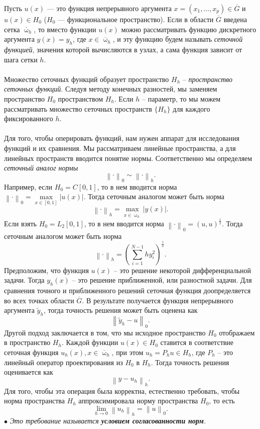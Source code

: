 \documentclass[a4paper, 12pt]{report}
\numberwithin{equation}{section}
\newcommand{\ol}{\overline}
\renewcommand{\omega}{\upomega}
\newcommand\Norm[1]{\left\| #1 \right\|}
\begin{document}
Пусть $u(x)$ --- это функция непрерывного аргумента $x = (x_1, \ldots, x_p)\in \overline G$ и $u(x) \in H_0$ ($H_0$ --- функциональное пространство). Если в области $\overline G$ введена сетка $\overline \omega_h$, то вместо функции $u(x)$ можно рассматривать функцию дискретного аргумента $y(x) = y_h$, где $x\in \ol \omega _h$, и эту функцию будем называть \textit{сеточной функцией}, значения которой вычисляются в узлах, а сама функция зависит от шага сетки $h$.\\\\
Множество сеточных функций образует пространство $H_h$ -- \textit{пространство сеточных функций}. Следуя методу конечных разностей, мы заменяем пространство $H_0$ пространством $H_h$. Если $h$ -- параметр, то мы можем рассматривать множество сеточных пространств $\{H_h\}$ для каждого фиксированного $h$.\\\\
Для того, чтобы оперировать функций, нам нужен аппарат для исследования функций и их сравнения. Мы рассматриваем линейные пространства, а для линейных пространств вводится понятие нормы. Соответственно мы определяем \textit{сеточный аналог нормы} $$\Norm {\cdot}_0 \sim \Norm {\cdot} _h.$$
Например, если $H_ 0 = C[0,1]$, то в нем вводится норма $\Norm {\cdot}_0 = \underset{x\in [0,1]} {\max}|u(x)|$. Тогда сеточным аналогом может быть норма $$\Norm {\cdot}_h = \underset{x \in \ol \omega_h}{\max}|y(x)|.$$
Если взять $H_ 0 = L_2[0,1]$, то в нем вводится норма $\Norm {\cdot}_0 = (u,u)^\frac12$. Тогда сеточным аналогом может быть норма $$\Norm {\cdot}_h = \left(\sum_{i=1}^{N-1}hy_i^2\right)^\frac12.$$
Предположим, что функция $u(x)$ -- это решение некоторой дифференциальной задачи. Тогда $y_h(x)$ -- это решение приближенной, или разностной задачи. Для сравнения точного и приближенного решений сеточная функция доопределяется во всех точках области $\ol G$. В результате получается функция непрерывного аргумента $\widetilde{y}_h$, тогда точность решения может быть оценена как $$\Norm{\widetilde{y}_h - u}_0.$$
Другой подход заключается в том, что мы исходное пространство $H_0$ отображаем в пространство $H_h$. Каждой функции $u(x)\in H_0$ ставится в соответствие сеточная функция $u_h(x), x \in \ol \omega _h$, при этом $u_h = P_h u \in H_h$, где $P_h$ -- это линейный оператор проектирования из $H_0$ в $H_h$. Тогда точность решения оценивается как $$\Norm{y-u_h}_h.$$ Для того, чтобы эта операция была корректна, естественно требовать, чтобы норма пространства $H_h$ аппроксимировала норму пространства $H_0$, то есть $$\lim\limits_{h\to 0}\Norm{u_h}_h = \Norm{u}_0.$$
$\bullet$ \textit{Это требование называется \textbf{условием согласованности норм}.}\\\\
\end{document}
